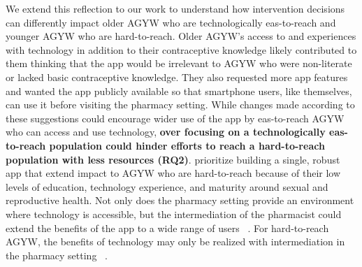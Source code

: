 We extend this reflection to our work to understand how intervention decisions can differently impact older AGYW who are technologically eas-to-reach and younger AGYW who are hard-to-reach. Older AGYW’s access to and experiences with technology in addition to their contraceptive knowledge likely contributed to them thinking that the app would be irrelevant to AGYW who were non-literate or lacked basic contraceptive knowledge. They also requested more app features and wanted the app publicly available so that smartphone users, like themselves, can use it before visiting the pharmacy setting. While changes made according to these suggestions could encourage wider use of the app by eas-to-reach AGYW who can access and use technology,  \textbf{over focusing on a technologically eas-to-reach population could hinder efforts to reach a hard-to-reach population with less resources (RQ2)}.  prioritize building a single, robust app that extend impact to AGYW who are hard-to-reach because of their low levels of education, technology experience, and maturity around sexual and reproductive health. Not only does the pharmacy setting provide an environment where technology is accessible, but the intermediation of the pharmacist could extend the benefits of the app to a wide range of users ~\cite{10.1145/1753326.1753718}. For hard-to-reach AGYW, the benefits of technology may only be realized with intermediation in the pharmacy setting ~\cite{10.1145/2369220.2369258}. 



